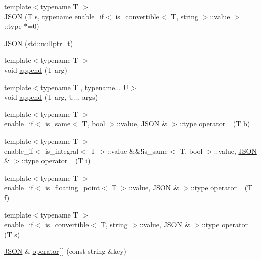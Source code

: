 \begin{DoxyCompactItemize}
\item 
{\footnotesize template$<$typename T $>$ }\\\mbox{\hyperlink{classjson_1_1_j_s_o_n_af9b32203c09726dd7acbb7e7c11fcd06}{J\+S\+ON}} (T s, typename enable\+\_\+if$<$ is\+\_\+convertible$<$ T, string $>$\+::value $>$\+::type $\ast$=0)
\item 
\mbox{\hyperlink{classjson_1_1_j_s_o_n_ac26eaaa4a2b504b8f7393e73c96e89ec}{J\+S\+ON}} (std\+::nullptr\+\_\+t)
\item 
{\footnotesize template$<$typename T $>$ }\\void \mbox{\hyperlink{classjson_1_1_j_s_o_n_aafb54a2b47ec9bbd7548a60db23fb4cf}{append}} (T arg)
\item 
{\footnotesize template$<$typename T , typename... U$>$ }\\void \mbox{\hyperlink{classjson_1_1_j_s_o_n_ac6a839771cd2c373614e9640eeef6e13}{append}} (T arg, U... args)
\item 
{\footnotesize template$<$typename T $>$ }\\enable\+\_\+if$<$ is\+\_\+same$<$ T, bool $>$\+::value, \mbox{\hyperlink{classjson_1_1_j_s_o_n}{J\+S\+ON}} \& $>$\+::type \mbox{\hyperlink{classjson_1_1_j_s_o_n_a1ee7a8f339bd04d78a4db4aa09cc4e53}{operator=}} (T b)
\item 
{\footnotesize template$<$typename T $>$ }\\enable\+\_\+if$<$ is\+\_\+integral$<$ T $>$\+::value \&\&!is\+\_\+same$<$ T, bool $>$\+::value, \mbox{\hyperlink{classjson_1_1_j_s_o_n}{J\+S\+ON}} \& $>$\+::type \mbox{\hyperlink{classjson_1_1_j_s_o_n_aed9846560a9b7c25b26f684e8d9f32f6}{operator=}} (T i)
\item 
{\footnotesize template$<$typename T $>$ }\\enable\+\_\+if$<$ is\+\_\+floating\+\_\+point$<$ T $>$\+::value, \mbox{\hyperlink{classjson_1_1_j_s_o_n}{J\+S\+ON}} \& $>$\+::type \mbox{\hyperlink{classjson_1_1_j_s_o_n_ac272eeeb42a552c4190a320a4f58a062}{operator=}} (T f)
\item 
{\footnotesize template$<$typename T $>$ }\\enable\+\_\+if$<$ is\+\_\+convertible$<$ T, string $>$\+::value, \mbox{\hyperlink{classjson_1_1_j_s_o_n}{J\+S\+ON}} \& $>$\+::type \mbox{\hyperlink{classjson_1_1_j_s_o_n_ab2dd5163c63d60978a2067a2c1ba50ee}{operator=}} (T s)
\item 
\mbox{\hyperlink{classjson_1_1_j_s_o_n}{J\+S\+ON}} \& \mbox{\hyperlink{classjson_1_1_j_s_o_n_a29c695c67a5b34a3b59af0da3c25d6b1}{operator\mbox{[}$\,$\mbox{]}}} (const string \&key)

\end{DoxyCompactItemize}
